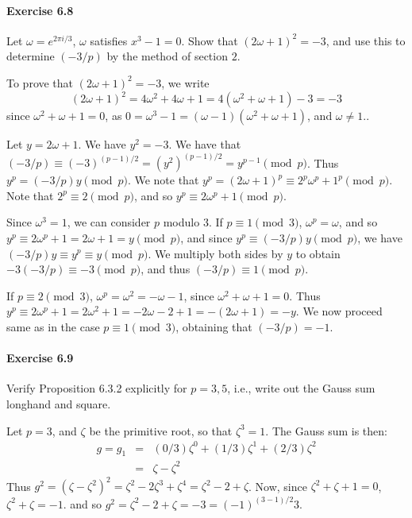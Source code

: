 \documentclass[notitlepage]{article}
\theoremstyle{definition}
\begin{document}
\paragraph{Exercise 6.8}
Let $\omega = e^{2 \pi i/3}$, $\omega$ satisfies $x^3 - 1 = 0$. Show
that $(2 \omega + 1)^2 = -3$, and use this to determine $(-3/p)$ by
the method of section $2$.

To prove that $(2 \omega + 1)^2 = - 3$, we write
\begin{equation}
  (2 \omega + 1)^2 = 4 \omega^2 + 4 \omega + 1 = 4(\omega^2 + \omega + 1) - 3 = -3
\end{equation}
since $\omega^2 + \omega + 1 = 0$, as
$0 = \omega^3 - 1 = (\omega-1)(\omega^2 + \omega + 1)$, and
$\omega \ne 1$..

Let $y = 2 \omega + 1$. We have $y^2 = -3$. We have that
$(-3/p) \equiv (-3)^{(p-1)/2} = (y^2)^{(p-1)/2} = y^{p-1} \pmod
p$. Thus $y^p = (-3/p)y \pmod p$. We note that
$y^p = (2 \omega + 1)^p \equiv 2^p \omega^p + 1^p \pmod p$. Note that
$2^p \equiv 2 \pmod p$, and so $y^p \equiv 2 \omega^p + 1 \pmod p$.

Since $\omega^3 = 1$, we can consider $p$ modulo 3. If
$p \equiv 1 \pmod 3$, $\omega^p = \omega$, and so
$y^p \equiv 2 \omega^p + 1 = 2 \omega + 1 = y \pmod p$, and since
$y^p \equiv (-3/p)y \pmod p$, we have
$(-3/p)y \equiv y^p \equiv y \pmod p$. We multiply both sides by $y$
to obtain $-3(-3/p) \equiv -3 \pmod p$, and thus
$(-3/p) \equiv 1 \pmod p$.

If $p \equiv 2 \pmod 3$, $\omega^p = \omega^2 = -\omega - 1$, since
$\omega^2 + \omega + 1 = 0$. Thus
$y^p \equiv 2 \omega^p + 1 = 2 \omega^2 + 1 = -2 \omega - 2 + 1 =
-(2\omega+1) = -y$. We now proceed same as in the case
$p \equiv 1 \pmod 3$, obtaining that $(-3/p) = -1$.

\paragraph{Exercise 6.9}
Verify Proposition 6.3.2 explicitly for $p = 3, 5$, i.e., write out
the Gauss sum longhand and square.

Let $p=3$, and $\zeta$ be the primitive root, so that $\zeta^3 =
1$. The Gauss sum is then:
\begin{eqnarray}
  g = g_1 &=& (0/3) \zeta^0 + (1/3) \zeta^1 + (2/3) \zeta^2\\
          &=& \zeta - \zeta^2
\end{eqnarray}
Thus
$g^2 = (\zeta - \zeta^2)^2 = \zeta^2 - 2 \zeta^3 + \zeta^4 = \zeta^2 -
2 + \zeta$. Now, since $\zeta^2 + \zeta + 1 = 0$,
$\zeta^2 + \zeta = -1$. and so
$g^2 = \zeta^2 - 2 + \zeta = -3 = (-1)^{(3-1)/2} 3$.
\end{document}
